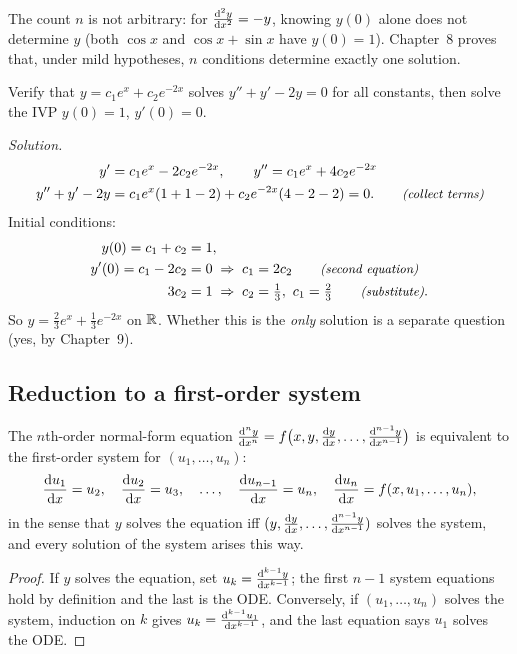 The count $n$ is not arbitrary: for $\frac{\mathrm{d}^{2}y}{\mathrm{d}x^{2}} = -y$, knowing $y(0)$ alone
does not determine $y$ (both $\cos x$ and $\cos x + \sin x$ have $y(0) = 1$).
Chapter~8 proves that, under mild hypotheses, $n$ conditions determine exactly
one solution.

\begin{example}\label{ex:ch01-ivp}
Verify that $y = c_1e^{x} + c_2e^{-2x}$ solves $y'' + y' - 2y = 0$ for all
constants, then solve the IVP $y(0) = 1$, $y'(0) = 0$.

\emph{Solution.}
\begin{align*}
  y' &= c_1e^x - 2c_2e^{-2x},\qquad y'' = c_1e^x + 4c_2e^{-2x}\\
  y'' + y' - 2y &= c_1e^x(1 + 1 - 2) + c_2e^{-2x}(4 - 2 - 2) = 0. \qquad\text{\small\itshape(collect terms)}
\end{align*}
Initial conditions:
\begin{align*}
  y(0) = c_1 + c_2 &= 1,\\
  y'(0) = c_1 - 2c_2 &= 0 \;\Rightarrow\; c_1 = 2c_2 \qquad\text{\small\itshape(second equation)}\\
  3c_2 &= 1 \;\Rightarrow\; c_2 = \tfrac13,\ c_1 = \tfrac23 \qquad\text{\small\itshape(substitute)}.
\end{align*}
So $y = \tfrac23e^x + \tfrac13e^{-2x}$ on $\mathbb{R}$. Whether this is the
\emph{only} solution is a separate question (yes, by Chapter~9).
\end{example}

\subsection{Reduction to a first-order system}

\begin{proposition}\label{prop:ch01-system}
The $n$th-order normal-form equation
$\frac{\mathrm{d}^{n}y}{\mathrm{d}x^{n}} = f\bigl(x,y,\frac{\mathrm{d}y}{\mathrm{d}x},\dots,\frac{\mathrm{d}^{n-1}y}{\mathrm{d}x^{n-1}}\bigr)$ is
equivalent to the first-order system for $(u_1,\dots,u_n)$:
\[
  \frac{\mathrm{d}u_1}{\mathrm{d}x} = u_2,\quad \frac{\mathrm{d}u_2}{\mathrm{d}x} = u_3,\quad\dots,\quad
  \frac{\mathrm{d}u_{n-1}}{\mathrm{d}x} = u_n,\quad \frac{\mathrm{d}u_n}{\mathrm{d}x} = f(x,u_1,\dots,u_n),
\]
in the sense that $y$ solves the equation iff $(y, \frac{\mathrm{d}y}{\mathrm{d}x},\dots,\frac{\mathrm{d}^{n-1}y}{\mathrm{d}x^{n-1}})$
solves the system, and every solution of the system arises this way.
\end{proposition}
\begin{proof}
If $y$ solves the equation, set $u_k = \frac{\mathrm{d}^{k-1}y}{\mathrm{d}x^{k-1}}$; the first $n-1$
system equations hold by definition and the last is the ODE. Conversely, if
$(u_1,\dots,u_n)$ solves the system, induction on $k$ gives
$u_k = \frac{\mathrm{d}^{k-1}u_1}{\mathrm{d}x^{k-1}}$, and the last equation says $u_1$ solves the ODE.
\end{proof}

